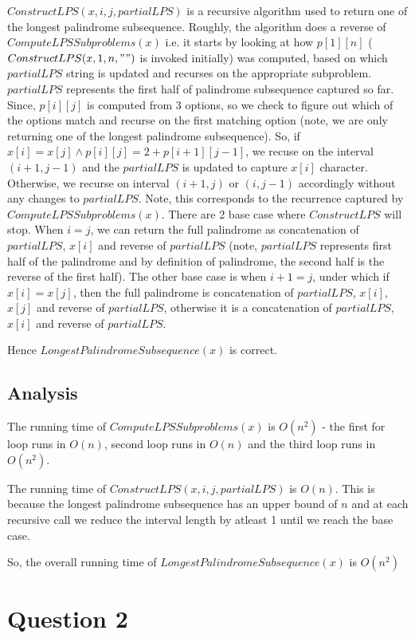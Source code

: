 \documentclass{article}
\begin{document}
    $ConstructLPS(x, i, j, partialLPS)$ is a recursive algorithm used to return one of the longest palindrome subsequence. Roughly, the algorithm does a reverse of $ComputeLPSSubproblems(x)$ i.e. it starts by looking at how $p[1][n]$ ($ConstructLPS(x, 1, n, "")$ is invoked initially) was computed, based on which $partialLPS$ string is updated and recurses on the appropriate subproblem. $partialLPS$ represents the first half of palindrome subsequence captured so far. Since, $p[i][j]$ is computed from 3 options, so we check to figure out which of the options match and recurse on the first matching option (note, we are only returning one of the longest palindrome subsequence). So, if $x[i] = x[j] \land p[i][j] = 2 + p[i+1][j-1]$, we recuse on the interval $(i+1, j-1)$ and the $partialLPS$ is updated to capture $x[i]$ character. Otherwise, we recurse on interval $(i+1, j)$ or $(i, j-1)$ accordingly without any changes to $partialLPS$. Note, this corresponds to the recurrence captured by $ComputeLPSSubproblems(x)$. There are 2 base case where $ConstructLPS$ will stop. When $i = j$, we can return the full palindrome as concatenation of $partialLPS$, $x[i]$ and reverse of $partialLPS$ (note, $partialLPS$ represents first half of the palindrome and by definition of palindrome, the second half is the reverse of the first half). The other base case is when $i+1 = j$, under which if $x[i] = x[j]$, then the full palindrome is concatenation of $partialLPS$, $x[i]$, $x[j]$ and reverse of $partialLPS$, otherwise it is a concatenation of $partialLPS$, $x[i]$ and reverse of $partialLPS$.

    Hence $LongestPalindromeSubsequence(x)$ is correct.

    \subsection*{Analysis}
    The running time of $ComputeLPSSubproblems(x)$ is $O(n^2)$ - the first for loop runs in $O(n)$, second loop runs in $O(n)$ and the third loop runs in $O(n^2)$.

    The running time of $ConstructLPS(x, i, j, partialLPS)$ is $O(n)$. This is because the longest palindrome subsequence has an upper bound of $n$ and at each recursive call we reduce the interval length by atleast 1 until we reach the base case.

    So, the overall running time of $LongestPalindromeSubsequence(x)$ is $O(n^2)$

    \section*{Question 2}
\end{document}
